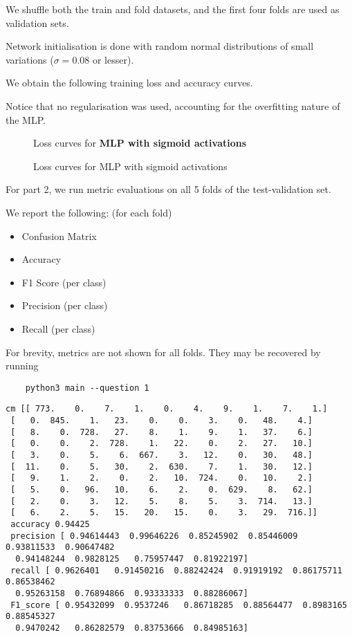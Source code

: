 We shuffle both the train and fold datasets, and the first four folds are used as validation sets. 

Network initialisation is done with random normal distributions of small variations ($\sigma = 0.08$ or lesser).

We obtain the following training loss and accuracy curves.

Notice that no regularisation was used, accounting for the overfitting nature of the MLP.

\begin{figure}[ht]
\centering
\caption{Loss curves for \textbf{MLP with sigmoid activations}}
\end{figure}

\begin{figure}[ht]
\centering
\caption{Loss curves for {MLP with sigmoid activations}}
\end{figure}

For part 2, we run metric evaluations on all 5 folds of the test-validation set.

We report the following: (for each fold)

\begin{itemize}
\item  Confusion Matrix
\item Accuracy
\item F1 Score (per class)
\item Precision (per class)
\item Recall (per class)
\end{itemize}

For brevity, metrics are not shown for all folds. They may be recovered by running

\begin{lstlisting}
    python3 main --question 1
\end{lstlisting}

\begin{lstlisting}[numbers=none]
cm [[ 773.    0.    7.    1.    0.    4.    9.    1.    7.    1.]
 [   0.  845.    1.   23.    0.    0.    3.    0.   48.    4.]
 [   8.    0.  728.   27.    8.    1.    9.    1.   37.    6.]
 [   0.    0.    2.  728.    1.   22.    0.    2.   27.   10.]
 [   3.    0.    5.    6.  667.    3.   12.    0.   30.   48.]
 [  11.    0.    5.   30.    2.  630.    7.    1.   30.   12.]
 [   9.    1.    2.    0.    2.   10.  724.    0.   10.    2.]
 [   5.    0.   96.   10.    6.    2.    0.  629.    8.   62.]
 [   2.    0.    3.   12.    5.    8.    5.    3.  714.   13.]
 [   6.    2.    5.   15.   20.   15.    0.    3.   29.  716.]] 
 accuracy 0.94425
 precision [ 0.94614443  0.99646226  0.85245902  0.85446009  0.93811533  0.90647482
  0.94148244  0.9828125   0.75957447  0.81922197]
 recall [ 0.9626401   0.91450216  0.88242424  0.91919192  0.86175711  0.86538462
  0.95263158  0.76894866  0.93333333  0.88286067]
 F1_score [ 0.95432099  0.9537246   0.86718285  0.88564477  0.8983165   0.88545327
  0.9470242   0.86282579  0.83753666  0.84985163]
\end{lstlisting}



